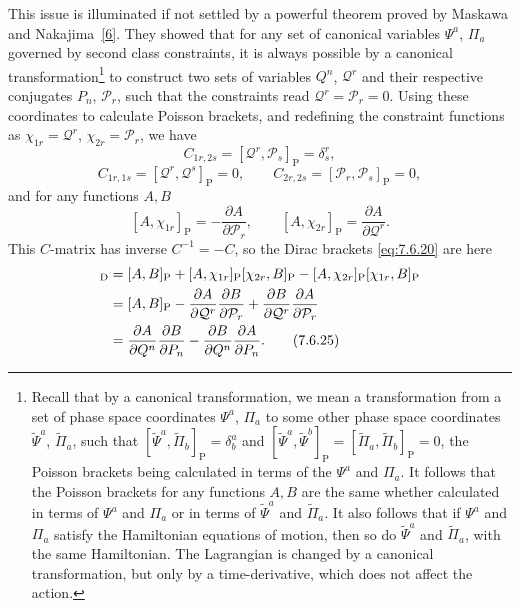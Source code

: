 This issue is illuminated if not settled by a powerful theorem proved by
Maskawa and Nakajima~\hyperref[ref:7.6]{[6]}. They showed that for any set of canonical variables
$\Psi^a$, $\Pi_a$ governed by second class constraints, it is always possible
by a canonical transformation\footnote{Recall that by a canonical
transformation, we mean a transformation from a set of phase space coordinates
$\Psi^a$, $\Pi_a$ to some other phase space coordinates
$\widetilde\Psi^a$, $\widetilde\Pi_a$, such that
$[\widetilde\Psi^a,\widetilde\Pi_b]_{\mathrm P}=\delta^a_b$ and
$[\widetilde\Psi^a,\widetilde\Psi^b]_{\mathrm P}
=[\widetilde\Pi_a,\widetilde\Pi_b]_{\mathrm P}=0$, the Poisson brackets being
calculated in terms of the $\Psi^a$ and $\Pi_a$. It follows that the Poisson
brackets for any functions $A,B$ are the same whether calculated in terms of
$\Psi^a$ and $\Pi_a$ or in terms of $\widetilde\Psi^a$ and
$\widetilde\Pi_a$. It also follows that if $\Psi^a$ and $\Pi_a$ satisfy the
Hamiltonian equations of motion, then so do $\widetilde\Psi^a$ and
$\widetilde\Pi_a$, with the same Hamiltonian. The Lagrangian is changed by a
canonical transformation, but only by a time-derivative, which does not affect
the action.} to construct two sets of variables $Q^n$, $\mathcal Q^r$ and
their respective conjugates $P_n$, $\mathcal P_r$, such that the constraints
read $\mathcal Q^r=\mathcal P_r=0$. Using these coordinates to calculate
Poisson brackets, and redefining the constraint functions as
$\chi_{1r}=\mathcal Q^r$, $\chi_{2r}=\mathcal P_r$, we have
\[
C_{1r,2s}=[\mathcal Q^r,\mathcal P_s]_{\mathrm P}=\delta^r_s,
\]
\[
C_{1r,1s}=[\mathcal Q^r,\mathcal Q^s]_{\mathrm P}=0,
\qquad
C_{2r,2s}=[\mathcal P_r,\mathcal P_s]_{\mathrm P}=0,
\]
and for any functions $A,B$
\[
[A,\chi_{1r}]_{\mathrm P}=-\frac{\partial A}{\partial\mathcal P_r},
\qquad
[A,\chi_{2r}]_{\mathrm P}=\frac{\partial A}{\partial\mathcal Q^r}.
\]
This $C$-matrix has inverse $C^{-1}=-C$, so the Dirac brackets \eqref{eq:7.6.20} are
here
\begin{align}
[A,B]_{\mathrm D}
&=[A,B]_{\mathrm P}
+[A,\chi_{1r}]_{\mathrm P}[\chi_{2r},B]_{\mathrm P}
-[A,\chi_{2r}]_{\mathrm P}[\chi_{1r},B]_{\mathrm P}\notag\\
&=[A,B]_{\mathrm P}
-\frac{\partial A}{\partial\mathcal Q^r}
 \frac{\partial B}{\partial\mathcal P_r}
+\frac{\partial B}{\partial\mathcal Q^r}
 \frac{\partial A}{\partial\mathcal P_r}\notag\\
&=\frac{\partial A}{\partial Q^n}\frac{\partial B}{\partial P_n}
-\frac{\partial B}{\partial Q^n}\frac{\partial A}{\partial P_n}.
\tag{7.6.25}\label{eq:7.6.25}
\end{align}
